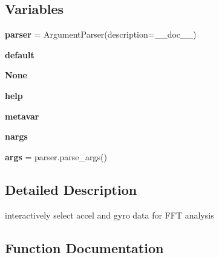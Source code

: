 \subsection*{Variables}
\begin{DoxyCompactItemize}
\item 
\mbox{\label{namespacepymavlink_1_1tools_1_1mavfft__int_a6399caa94e5528b597e4316134c2e937}} 
{\bfseries parser} = Argument\+Parser(description=\+\_\+\+\_\+doc\+\_\+\+\_\+)
\item 
\mbox{\label{namespacepymavlink_1_1tools_1_1mavfft__int_a0e6a9b47e77e47f3e7a65850daa6bede}} 
{\bfseries default}
\item 
\mbox{\label{namespacepymavlink_1_1tools_1_1mavfft__int_a51eb9bbd0dff74b63640e3ffcd329d47}} 
{\bfseries None}
\item 
\mbox{\label{namespacepymavlink_1_1tools_1_1mavfft__int_a7edea492310d4fb2f90f2028606e2c5e}} 
{\bfseries help}
\item 
\mbox{\label{namespacepymavlink_1_1tools_1_1mavfft__int_a319e6a187105fcfd07593d2568b83533}} 
{\bfseries metavar}
\item 
\mbox{\label{namespacepymavlink_1_1tools_1_1mavfft__int_a410dc81e9fd097b44d0580d29cef27e7}} 
{\bfseries nargs}
\item 
\mbox{\label{namespacepymavlink_1_1tools_1_1mavfft__int_a1096c19d6b3e2cd4071407b56498c6ac}} 
{\bfseries args} = parser.\+parse\+\_\+args()
\end{DoxyCompactItemize}


\subsection{Detailed Description}
\begin{DoxyVerb}interactively select accel and gyro data for FFT analysis
\end{DoxyVerb}
 

\subsection{Function Documentation}
\mbox{\label{namespacepymavlink_1_1tools_1_1mavfft__int_a4fea48da53af74119f00f7ddc66f87fb}} 
